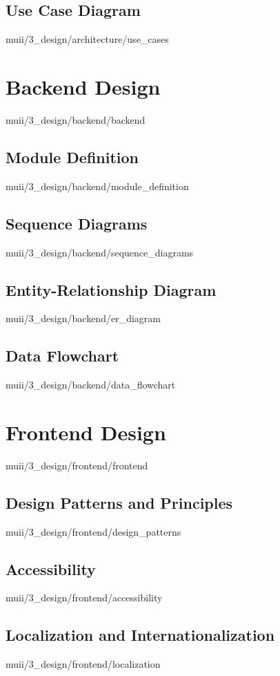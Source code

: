 \documentclass[english,epsbased,copyright,final,printable,covers,extendedindex,firstnumbered,tfm,gnuplot,loc,loe,lof,lot]{tfgtfmthesisuam}
\begin{document}
      \subsection{Use Case Diagram\label{SS:USECASEDIAG}}{muii/3_design/architecture/use_cases}

    \section{Backend Design\label{SEC:BACKDESIGN}}{muii/3_design/backend/backend}
      \subsection{Module Definition\label{SS:MODULEDEF}}{muii/3_design/backend/module_definition}
      \subsection{Sequence Diagrams\label{SS:SEQUENCEDIAG}}{muii/3_design/backend/sequence_diagrams}
      \subsection{Entity-Relationship Diagram\label{SS:DATABASEDIAG}}{muii/3_design/backend/er_diagram}
      \subsection{Data Flowchart\label{SS:DATAFLOW}}{muii/3_design/backend/data_flowchart}

    \section{Frontend Design\label{SEC:FRONTDESIGN}}{muii/3_design/frontend/frontend}
      \subsection{Design Patterns and Principles\label{SS:PATTPRINC}}{muii/3_design/frontend/design_patterns}
      \subsection{Accessibility\label{SS:ACCESSIBILITY}}{muii/3_design/frontend/accessibility}
      \subsection{Localization and Internationalization\label{SS:LOCALINTER}}{muii/3_design/frontend/localization}
\end{document}
